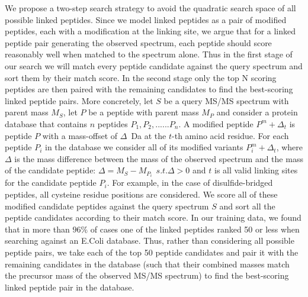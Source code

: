 \documentclass[arial,11pt]{article}
\begin{document}
We propose a two-step search strategy to avoid the quadratic search space of all possible linked peptides.  Since we model linked peptides as a pair of modified peptides, each with a modification at the linking site, we argue that for a linked peptide pair generating the observed spectrum, each peptide should score reasonably well when matched to the spectrum alone. Thus in the first stage of our search we will match every peptide candidate against the query spectrum and sort them by their match score.  In the second stage only the top N scoring peptides are then paired with the remaining candidates to find the best-scoring linked peptide pairs.  More concretely, let $S$ be a query MS/MS spectrum with parent mass $M_{S}$, let $P$ be a peptide with parent mass $M_{P}$ and consider a protein database that contains $n$ peptides ${P_{1}, P_{2}, ...... P_{n}}$. A modified peptide $P^m+\Delta_{t}$ is  peptide $P$ with a mass-offset of $\Delta$~Da at the $t$-th amino acid residue. For each peptide $P_{i}$ in the database we consider all of its modified variants $P^m_{i}+\Delta_{t}$, where $\Delta$ is the mass difference between the mass of the observed spectrum and the mass of the candidate peptide:  $\Delta = M_{S} - M_{P_{i}}\ \  s.t. \Delta > 0$ and $t$ is all valid linking sites for the candidate peptide $P_{i}$. For example, in the case of disulfide-bridged peptides, all cysteine residue positions are considered. We score all of these modified candidate peptides against the query spectrum $S$ and sort all the peptide candidates according to their match score. In our training data, we found that in more than $96\%$ of cases one of the linked peptides ranked 50 or less when searching against an E.Coli database.  Thus, rather than considering all possible peptide pairs, we take each of the top 50 peptide candidates and pair it with the remaining candidates in the database (such that their combined masses match the precursor mass of the observed MS/MS spectrum) to find the best-scoring linked peptide pair in the database.
\end{document}
